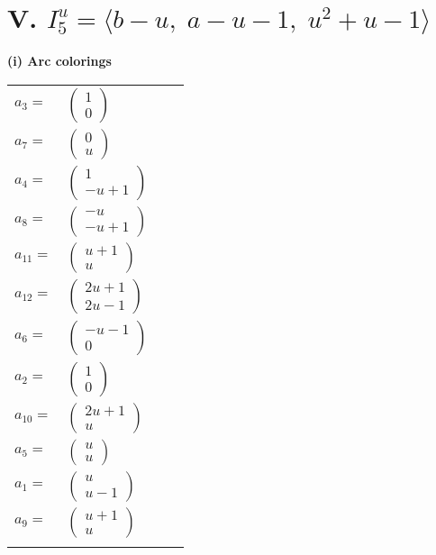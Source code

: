 \documentclass[1p]{elsarticle_modified}
\theoremstyle{definition}
\begin{document}
\centering \section*{V. $I^u_{5}= \langle b- u,\;a- u-1,\;u^2+u-1 \rangle$}
\flushleft \textbf{(i) Arc colorings}\\
\begin{tabular}{m{7pt} m{180pt} m{7pt} m{180pt} }
\flushright $a_{3}=$&$\begin{pmatrix}1\\0\end{pmatrix}$ \\
\flushright $a_{7}=$&$\begin{pmatrix}0\\u\end{pmatrix}$ \\
\flushright $a_{4}=$&$\begin{pmatrix}1\\- u+1\end{pmatrix}$ \\
\flushright $a_{8}=$&$\begin{pmatrix}- u\\- u+1\end{pmatrix}$ \\
\flushright $a_{11}=$&$\begin{pmatrix}u+1\\u\end{pmatrix}$ \\
\flushright $a_{12}=$&$\begin{pmatrix}2 u+1\\2 u-1\end{pmatrix}$ \\
\flushright $a_{6}=$&$\begin{pmatrix}- u-1\\0\end{pmatrix}$ \\
\flushright $a_{2}=$&$\begin{pmatrix}1\\0\end{pmatrix}$ \\
\flushright $a_{10}=$&$\begin{pmatrix}2 u+1\\u\end{pmatrix}$ \\
\flushright $a_{5}=$&$\begin{pmatrix}u\\u\end{pmatrix}$ \\
\flushright $a_{1}=$&$\begin{pmatrix}u\\u-1\end{pmatrix}$ \\
\flushright $a_{9}=$&$\begin{pmatrix}u+1\\u\end{pmatrix}$\\&\end{tabular}
\end{document}
